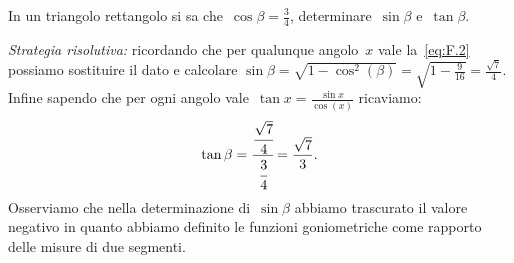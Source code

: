  \begin{esempio}
In un triangolo rettangolo si sa che~$\cos \beta=\frac{3}{4}$, 
determinare~$\sin \beta$ e~$\tan \beta$.

\emph{Strategia risolutiva:}
ricordando che per qualunque angolo~$x$ vale la~\ref{eq:F.2} possiamo 
sostituire 
il dato e calcolare
$\sin \beta=\sqrt{1-\cos ^{2}(\beta 
)}=\sqrt{1-\frac{9}{16}}=\frac{\sqrt{7}}{4}$. 
Infine sapendo che per ogni angolo vale~$\tan x=\frac{\sin x}{\cos (x)}$ 
ricaviamo:
\[\tan \beta=\cfrac{\cfrac{\sqrt{7}}{4}}{\cfrac{3}{4}}=\frac{\sqrt{7}}{3}.\]
Osserviamo che nella determinazione di~$\sin \beta$ abbiamo trascurato il 
valore 
negativo in quanto abbiamo definito
le funzioni goniometriche come rapporto delle misure di due segmenti.
 \end{esempio}


